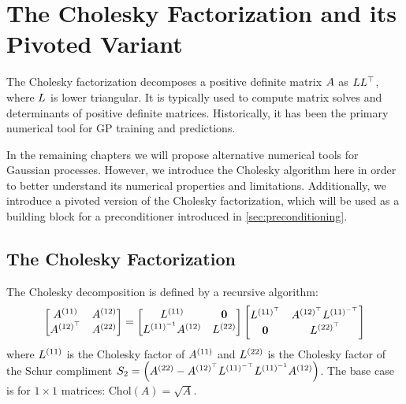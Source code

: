 \section{The Cholesky Factorization and its Pivoted Variant}

The Cholesky factorization decomposes a positive definite matrix $A$ as $L L^{\top}$, where $L$ is lower triangular.
It is typically used to compute matrix solves and determinants of positive definite matrices.
Historically, it has been the primary numerical tool for GP training and predictions.

In the remaining chapters we will propose alternative numerical tools for Gaussian processes.
However, we introduce the Cholesky algorithm here in order to better understand its numerical properties and limitations.
Additionally, we introduce a pivoted version of the Cholesky factorization, which will be used as a building block for a preconditioner introduced in \cref{sec:preconditioning}.

\subsection{The Cholesky Factorization}
%
The Cholesky decomposition is defined by a recursive algorithm:
%
\begin{equation}
 \label{eq:cholesky_full}
 \begin{bmatrix} A^{(11)} & A^{(12)} \\ A^{(12)^\top} & A^{(22)}\end{bmatrix}
 =
 \begin{bmatrix} L^{(11)} & \mathbf{0} \\ L^{(11)^{-1}} A^{(12)} & L^{(22)}\end{bmatrix}
 \begin{bmatrix} L^{(11)^\top} & A^{(12)^\top} L^{(11)^{-\top}} \\ \mathbf{0} & L^{(22)^\top}\end{bmatrix}
\end{equation}
%
where $L^{(11)}$ is the Cholesky factor of $A^{(11)}$ and $L^{(22)}$ is the Cholesky factor of the Schur compliment $S_2 = \left( A^{(22)} - A^{(12)^\top} L^{(11)^{-\top}} L^{(11)^{-1}} A^{(12)} \right)$.
The base case is for $1 \times 1$ matrices: $\text{Chol}(A) = \sqrt{A}$.

